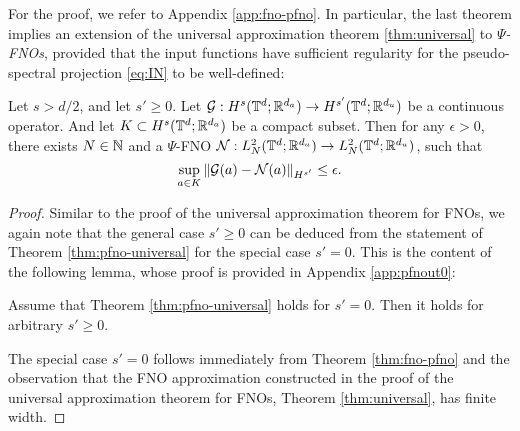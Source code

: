 \documentclass[reqno,a4paper]{amsart}
\begin{document}
For the proof, we refer to Appendix \ref{app:fno-pfno}. In particular, the last theorem implies an extension of the universal approximation theorem \ref{thm:universal} to \emph{$\Psi$-FNOs}, provided that the input functions have sufficient regularity for the pseudo-spectral projection \eqref{eq:IN} to be well-defined:

\begin{theorem} \label{thm:pfno-universal}
Let $s > d/2$, and let $s'\ge 0$. Let $\mathcal{G}: H^{s}(\mathbb{T}^d;\mathbb{R}^{d_a}) \to H^{s'}(\mathbb{T}^d;\mathbb{R}^{d_u})$ be a continuous operator. And let $K\subset H^{s}(\mathbb{T}^d;\mathbb{R}^{d_a})$ be a compact subset. Then for any $\epsilon > 0$, there exists $N\in \mathbb{N}$ and a $\Psi$-FNO $\mathcal{N}: L^2_N(\mathbb{T}^d;\mathbb{R}^{d_a}) \to L^2_N(\mathbb{T}^d;\mathbb{R}^{d_u})$, such that 
\[
\sup_{a\in K}
\Vert 
\mathcal{G}(a) - \mathcal{N}(a)
\Vert_{H^{s'}}
\le \epsilon.
\]
\end{theorem}

\begin{proof}
Similar to the proof of the universal approximation theorem for FNOs, we again note that the general case $s'\ge 0$ can be deduced from the statement of Theorem \ref{thm:pfno-universal} for the special case $s'=0$. This is the content of the following lemma, whose proof is provided in Appendix \ref{app:pfnout0}:
\begin{lemma} \label{lem:pfnout0}
Assume that Theorem \ref{thm:pfno-universal} holds for $s'=0$. Then it holds for arbitrary $s'\ge 0$.
\end{lemma}

The special case $s'=0$ follows immediately from Theorem \ref{thm:fno-pfno} and the observation that the FNO approximation constructed in the proof of the universal approximation theorem for FNOs, Theorem \ref{thm:universal}, has finite width. 
\end{proof}
\end{document}
